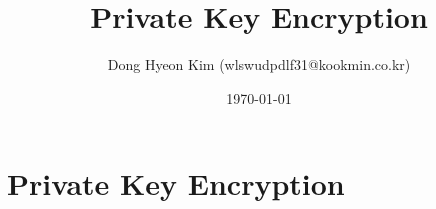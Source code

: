 \documentclass[10pt, a4paper]{report}
\title{Private Key Encryption}
\author{Dong Hyeon Kim (wlswudpdlf31@kookmin.co.kr)}
\date{\today}
\begin{document}
\tableofcontents
\chapter{Private Key Encryption}
% 

% 


% 
\end{document}
